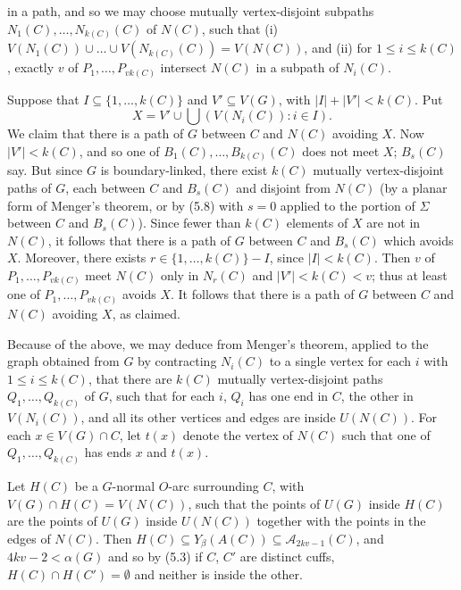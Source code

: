 \noindent in a path, and so we may choose mutually vertex-disjoint subpaths $N_1(C), \dots, N_{k(C)}(C)$ of $N(C)$, such that (i) $V(N_1(C)) \cup \dots \cup V(N_{k(C)}(C)) = V(N(C))$, and (ii) for $1 \le i \le k(C)$, exactly $v$ of $P_1, \dots, P_{vk(C)}$ intersect $N(C)$ in a subpath of $N_i(C)$.

Suppose that $I \subseteq \{1, \dots, k(C)\}$ and $V' \subseteq V(G)$, with $|I| + |V'| < k(C)$. Put
\begin{equation*}
X = V' \cup \bigcup (V(N_i(C)) : i \in I).
\end{equation*}
We claim that there is a path of $G$ between $C$ and $N(C)$ avoiding $X$. Now $|V'| < k(C)$, and so one of $B_1(C), \dots, B_{k(C)}(C)$ does not meet $X$; $B_s(C)$ say. But since $G$ is boundary-linked, there exist $k(C)$ mutually vertex-disjoint paths of $G$, each between $C$ and $B_s(C)$ and disjoint from $N(C)$ (by a planar form of Menger's theorem, or by (5.8) with $s = 0$ applied to the portion of $\Sigma$ between $C$ and $B_s(C)$). Since fewer than $k(C)$ elements of $X$ are not in $N(C)$, it follows that there is a path of $G$ between $C$ and $B_s(C)$ which avoids $X$. Moreover, there exists $r \in \{1, \dots, k(C)\} - I$, since $|I| < k(C)$. Then $v$ of $P_1, \dots, P_{vk(C)}$ meet $N(C)$ only in $N_r(C)$ and $|V'| < k(C) < v$; thus at least one of $P_1, \dots, P_{vk(C)}$ avoids $X$. It follows that there is a path of $G$ between $C$ and $N(C)$ avoiding $X$, as claimed.

Because of the above, we may deduce from Menger's theorem, applied to the graph obtained from $G$ by contracting $N_i(C)$ to a single vertex for each $i$ with $1 \le i \le k(C)$, that there are $k(C)$ mutually vertex-disjoint paths $Q_1, \dots, Q_{k(C)}$ of $G$, such that for each $i$, $Q_i$ has one end in $C$, the other in $V(N_i(C))$, and all its other vertices and edges are inside $U(N(C))$. For each $x \in V(G) \cap C$, let $t(x)$ denote the vertex of $N(C)$ such that one of $Q_1, \dots, Q_{k(C)}$ has ends $x$ and $t(x)$.

Let $H(C)$ be a $G$-normal $O$-arc surrounding $C$, with $V(G) \cap H(C) = V(N(C))$, such that the points of $U(G)$ inside $H(C)$ are the points of $U(G)$ inside $U(N(C))$ together with the points in the edges of $N(C)$. Then $H(C) \subseteq Y_\beta(A(C)) \subseteq \mathscr{A}_{2kv - 1}(C)$, and $4kv - 2 < \alpha(G)$ and so by (5.3) if $C$, $C'$ are distinct cuffs, $H(C) \cap H(C') = \emptyset$ and neither is inside the other.

